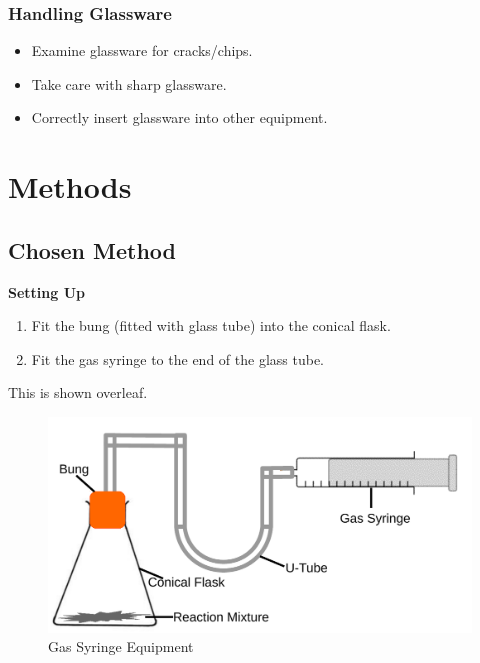 \subsubsection{Handling Glassware}

\begin{itemize}
\item Examine glassware for cracks/chips.
\item Take care with sharp glassware.
\item Correctly insert glassware into other equipment.
\end{itemize}




\section{Methods}

	\subsection{Chosen Method} \label{Chosen Method}

\textbf{Setting Up}

\begin{enumerate}
\item Fit the bung (fitted with glass tube) into the conical flask.
\item Fit the gas syringe to the end of the glass tube.
\end{enumerate}


This is shown overleaf.



\begin{figure}[H]
    \includegraphics[width=\textwidth]{./Planning/Images/GasSyringe.pdf}
    \caption{Gas Syringe Equipment} \label{fig:Gas Syringe}
\end{figure}

